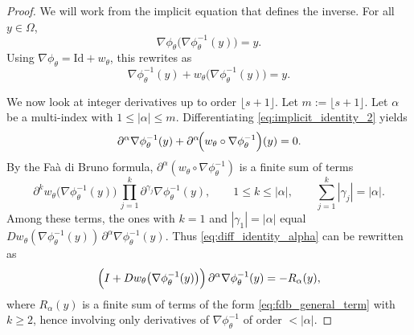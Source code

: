 \documentclass{article}
\newcommand{\1}{\mathds{1}}
\theoremstyle{plain}
\theoremstyle{definition}
\theoremstyle{remark}
\begin{document}
\begin{proof}
We will work from the implicit equation that defines the inverse.
For all $y\in\Omega$,
\begin{equation}
\label{eq:implicit_identity}
\nabla\phi_\theta\bigl(\nabla\phi_\theta^{-1}(y)\bigr) = y.
\end{equation}
Using $\nabla\phi_\theta = \mathrm{Id}+w_\theta$, this rewrites as
\begin{equation}
\label{eq:implicit_identity_2}
\nabla\phi_\theta^{-1}(y) + w_\theta\bigl(\nabla\phi_\theta^{-1}(y)\bigr) = y.
\end{equation}

We now look at integer derivatives up to order $\lfloor s+1\rfloor$.
Let
$
m := \lfloor s+1\rfloor.
$
Let $\alpha$ be a multi-index with $1\le |\alpha| \le m$. Differentiating \eqref{eq:implicit_identity_2} yields
\begin{equation}
\label{eq:diff_identity_alpha}
\partial^\alpha \nabla\phi_\theta^{-1}(y) + \partial^\alpha\!\Bigl(w_\theta\circ\nabla\phi_\theta^{-1}\Bigr)(y) = 0.
\end{equation}
By the Fa\`a di Bruno formula, $\partial^\alpha(w_\theta\circ\nabla\phi_\theta^{-1})$ is a finite sum of terms
\begin{equation}
\label{eq:fdb_general_term}
\partial^k w_\theta\bigl(\nabla\phi_\theta^{-1}(y)\bigr)\,
\prod_{j=1}^k \partial^{\gamma_j}\nabla\phi_\theta^{-1}(y),
\qquad
1\le k\le|\alpha|,
\qquad
\sum_{j=1}^k |\gamma_j| = |\alpha|.
\end{equation}
Among these terms, the ones with $k=1$ and $|\gamma_1|=|\alpha|$ equal
$Dw_\theta(\nabla\phi_\theta^{-1}(y))\,\partial^\alpha \nabla\phi_\theta^{-1}(y)$.
Thus \eqref{eq:diff_identity_alpha} can be rewritten as
\begin{equation}
\label{eq:solve_alpha}
\Bigl(I + Dw_\theta\bigl(\nabla\phi_\theta^{-1}(y)\bigr)\Bigr)\,\partial^\alpha \nabla\phi_\theta^{-1}(y)
=
- R_\alpha(y),
\end{equation}
where $R_\alpha(y)$ is a finite sum of terms of the form \eqref{eq:fdb_general_term} with $k\ge 2$, hence involving only
derivatives of $\nabla\phi_\theta^{-1}$ of order $<|\alpha|$.


\end{proof}
\end{document}
